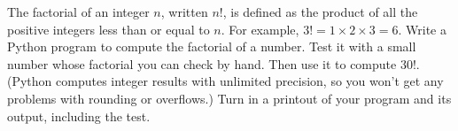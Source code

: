   The factorial of an integer $n$, written $n!$, is defined as the product of all the
  positive integers less than or equal to $n$. For example, $3!=1\times2\times3=6$.
  Write a Python program to compute the factorial of a number.
  Test it with a small number whose factorial you can check by hand.
  Then use it to compute $30!$. (Python computes integer results with
  unlimited precision, so you won't get any problems with rounding or overflows.)
  Turn in a printout of your program and its output, including the test.
